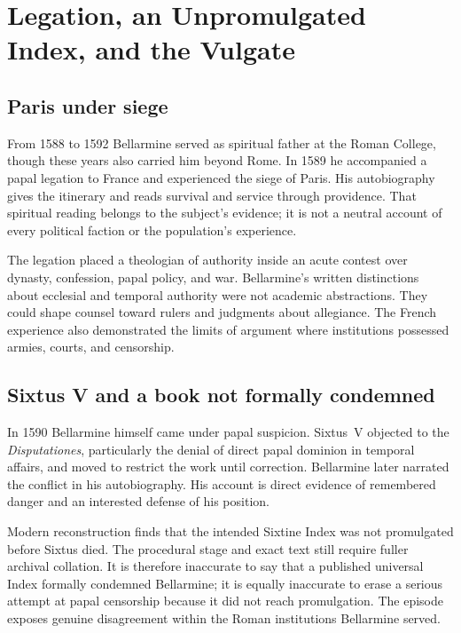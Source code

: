 \section{Legation, an Unpromulgated Index, and the Vulgate}

\subsection{Paris under siege}

From 1588 to 1592 Bellarmine served as spiritual father at the Roman College,
though these years also carried him beyond Rome.  In 1589 he accompanied a
papal legation to France and experienced the siege of Paris.  His
autobiography gives the itinerary and reads survival and service through
providence.  That spiritual reading belongs to the subject's evidence; it is
not a neutral account of every political faction or the population's
experience.

The legation placed a theologian of authority inside an acute contest over
dynasty, confession, papal policy, and war.  Bellarmine's written distinctions
about ecclesial and temporal authority were not academic abstractions.  They
could shape counsel toward rulers and judgments about allegiance.  The French
experience also demonstrated the limits of argument where institutions
possessed armies, courts, and censorship.

\subsection{Sixtus V and a book not formally condemned}

In 1590 Bellarmine himself came under papal suspicion.  Sixtus~V objected to
the \emph{Disputationes}, particularly the denial of direct papal dominion in
temporal affairs, and moved to restrict the work until correction.  Bellarmine
later narrated the conflict in his autobiography.  His account is direct
evidence of remembered danger and an interested defense of his position.

Modern reconstruction finds that the intended Sixtine Index was not
promulgated before Sixtus died.  The procedural stage and exact text still
require fuller archival collation.  It is therefore inaccurate to say that a
published universal Index formally condemned Bellarmine; it is equally
inaccurate to erase a serious attempt at papal censorship because it did not
reach promulgation.  The episode exposes genuine disagreement within the
Roman institutions Bellarmine served.

